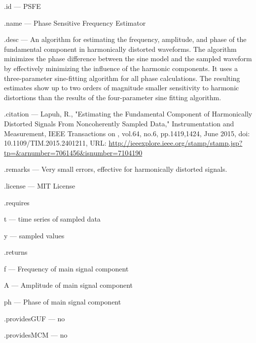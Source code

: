 \begin{tightdesc}
\item [\textsf{.id}] --- PSFE
\item [\textsf{.name}] --- Phase Sensitive Frequency Estimator
\item [\textsf{.desc}] --- An algorithm for estimating the frequency, amplitude, and phase of the fundamental component in harmonically distorted waveforms. The algorithm minimizes the phase difference between the sine model and the sampled waveform by effectively minimizing the influence of the harmonic components. It uses a three-parameter sine-fitting algorithm for all phase calculations. The resulting estimates show up to two orders of magnitude smaller sensitivity to harmonic distortions than the results of the four-parameter sine fitting algorithm.
\item [\textsf{.citation}] --- Lapuh, R., "Estimating the Fundamental Component of Harmonically Distorted Signals From Noncoherently Sampled Data," Instrumentation and Measurement, IEEE Transactions on , vol.64, no.6, pp.1419,1424, June 2015, doi: 10.1109/TIM.2015.2401211, URL: \url{http://ieeexplore.ieee.org/stamp/stamp.jsp?tp=\&arnumber=7061456\&isnumber=7104190}
\item [\textsf{.remarks}] --- Very small errors, effective for harmonically distorted signals.
\item [\textsf{.license}] --- MIT License
\item [\textsf{.requires}] \rule{0em}{0em}
\begin{tightdesc}
\item [\textsf{t}] --- time series of sampled data
\item [\textsf{y}] --- sampled values
\end{tightdesc}
\item [\textsf{.returns}] \rule{0em}{0em}
\begin{tightdesc}
\item [\textsf{f}] --- Frequency of main signal component
\item [\textsf{A}] --- Amplitude of main signal component
\item [\textsf{ph}] --- Phase of main signal component
\end{tightdesc}
\item [\textsf{.providesGUF}] --- no
\item [\textsf{.providesMCM}] ---  no
\end{tightdesc}
